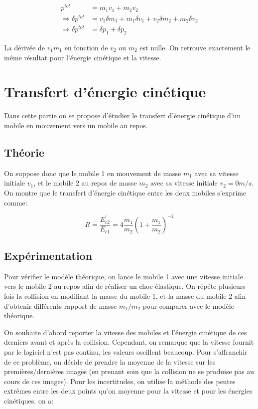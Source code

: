 \documentclass[12pt]{article}
\begin{document}
\begin{align}
    p^{tot} & = m_1v_1 + m_2v_2 \\
    \Rightarrow \delta p^{tot} & = v_1\delta m_1 + m_1\delta v_1 + v_2\delta m_2 + m_2\delta v_2 \\
    \Rightarrow \delta p^{tot} & = \delta p_1 + \delta p_2
\end{align}

La dérivée de $v_1m_1$ en fonction de $v_2$ ou $m_2$ est nulle. On retrouve exactement le même résultat pour l'énergie cinétique et la vitesse.

\section{Transfert d'énergie cinétique}
Dans cette partie on se propose d'étudier le transfert d'énergie cinétique d'un mobile en mouvement vers 
un mobile au repos. 

\subsection{Théorie}
On suppose donc que le mobile 1 en mouvement de masse $m_1$ avec sa vitesse initiale $v_1$, et le mobile 2 au repos de masse $m_2$ avec sa vitesse initiale
$v_2 = 0 m/s$. On montre que le transfert d'énergie cinétique entre les deux mobiles s'exprime comme:

\begin{equation}
    R = \frac{E^{'}_{c2}}{E_{c1}} = 4 \frac{m_1}{m_2} \left(1 + \frac{m_1}{m_2} \right)^{-2}
\end{equation}

\subsection{Expérimentation}
Pour vérifier le modèle théorique, on lance le mobile 1 avec une vitesse initiale vers le mobile 2 au repos afin de réaliser un choc élastique.
On répéte plusieurs fois la collision en modifiant la masse du mobile 1, et la masse du mobile 2 afin d'obtenir différents rapport de masse $m_1/m_2$ pour comparer avec
le modèle théorique.

On souhaite d'abord reporter la vitesse des mobiles et l'énergie cinétique de ces derniers avant et après la collision. Cependant, on remarque que la vitesse 
fournit par le logiciel n'est pas continu, les valeurs oscillent beaucoup. Pour s'affranchir de ce problème, on décide de prendre la moyenne de la vitesse sur les premières/dernières images
(en prenant soin que la collision ne se produise pas au cours de ces images). Pour les incertitudes, on utilise la méthode des pentes extrêmes entre les deux points qu'on moyenne pour la vitesse et pour les énergies cinétiques, on a:
\end{document}
